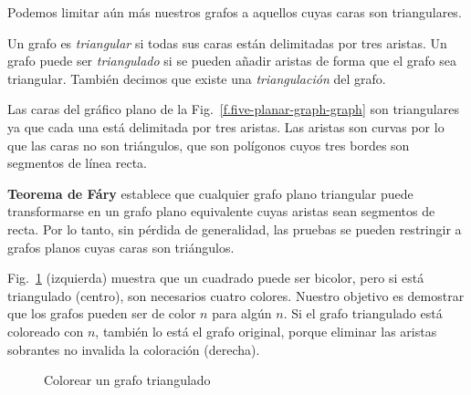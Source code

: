 {{Podemos limitar aún más nuestros grafos a aquellos cuyas caras son triangulares.

\begin{definition}
Un grafo es \emph{triangular} si todas sus caras están delimitadas por tres aristas. Un grafo puede ser \emph{triangulado} si se pueden añadir aristas de forma que el grafo sea triangular. También decimos que existe una \emph{triangulación} del grafo.
\end{definition}

\begin{example}
Las caras del gráfico plano de la Fig.~\ref{f.five-planar-graph-graph} son triangulares ya que cada una está delimitada por tres aristas. Las aristas son curvas por lo que las caras no son triángulos, que son polígonos cuyos tres bordes son segmentos de línea recta.
\end{example}

\begin{advanced}
\textbf{Teorema de F\'{a}ry} establece que cualquier grafo plano triangular puede transformarse en un grafo plano equivalente cuyas aristas sean segmentos de recta. Por lo tanto, sin pérdida de generalidad, las pruebas se pueden restringir a grafos planos cuyas caras son triángulos.
\end{advanced}

\begin{example}
Fig.~\ref{f.five-triangular-graph} (izquierda) muestra que un cuadrado puede ser bicolor, pero si está triangulado (centro), son necesarios cuatro colores. Nuestro objetivo es demostrar que los grafos pueden ser de color $n$ para algún $n$. Si el grafo triangulado está coloreado con $n$, también lo está el grafo original, porque eliminar las aristas sobrantes no invalida la coloración (derecha).
\end{example}

\begin{figure}[h]
\begin{center}
\end{center}
\caption{Colorear un grafo triangulado}\label{f.five-triangular-graph}
\end{figure}

}}

